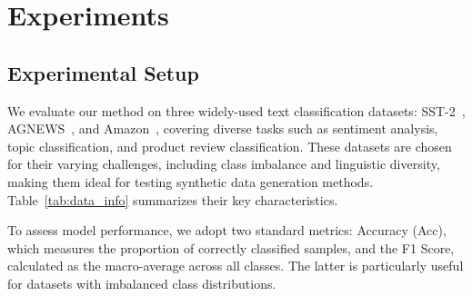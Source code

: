 \section{Experiments}
\subsection{Experimental Setup}


We evaluate our method on three widely-used text classification datasets: SST-2~\cite{sst2}, AGNEWS~\cite{agnews}, and Amazon~\cite{amazon}, covering diverse tasks such as sentiment analysis, topic classification, and product review classification. These datasets are chosen for their varying challenges, including class imbalance and linguistic diversity, making them ideal for testing synthetic data generation methods. Table~\ref{tab:data_info} summarizes their key characteristics.

To assess model performance, we adopt two standard metrics: Accuracy (Acc), which measures the proportion of correctly classified samples, and the F1 Score, calculated as the macro-average across all classes. The latter is particularly useful for datasets with imbalanced class distributions. %

